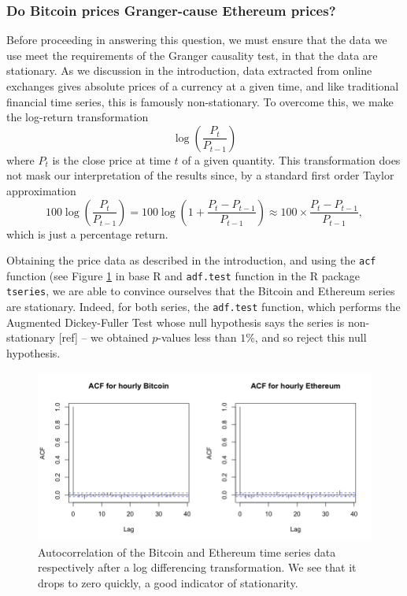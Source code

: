 \documentclass[twoside]{report}
\newcommand{\code}{\texttt}
\begin{document}
\begin{spacing}{1}
\subsubsection{Do Bitcoin prices Granger-cause Ethereum prices?}
Before proceeding in answering this question, we must ensure that the data we use meet the requirements of the Granger causality test, in that the data are stationary. As we discussion in the introduction, data extracted from online exchanges gives absolute prices of a currency at a given time, and like traditional financial time series, this is famously non-stationary. To overcome this, we make the log-return transformation \[
\log\left(\frac{P_t}{P_{t-1}}\right) 
\]
where $P_t$ is the close price at time $t$ of a given quantity. This transformation does not mask our interpretation of the results since, by a standard first order Taylor approximation \[
100\log\left(\frac{P_t}{P_{t-1}}\right) = 100\log\left(1 + \frac{P_t - P_{t-1}}{P_{t-1}}\right) \approx 100 \times \frac{P_t - P_{t-1}}{P_{t-1}},
\]
which is just a percentage return.

Obtaining the price data as described in the introduction, and using the \code{acf} function (see Figure \ref{fig:acf_btc_eth} in base R and \code{adf.test} function in the R package \code{tseries}, we are able to convince ourselves that the Bitcoin and Ethereum series are stationary. Indeed, for both series, the \code{adf.test} function, which performs the Augmented Dickey-Fuller Test whose null hypothesis says the series is non-stationary [ref] -- we obtained $p$-values less than $1\%$, and so reject this null hypothesis. 

\begin{figure}[!htbp]
    \centering
    \includegraphics[width=\linewidth]{Causality_between_time_series/acf_btc_eth.png}
    \caption{Autocorrelation of the Bitcoin and Ethereum time series data respectively after a log differencing transformation. We see that it drops to zero quickly, a good indicator of stationarity.}
    \label{fig:acf_btc_eth}
\end{figure}


\end{spacing}
\end{document}
